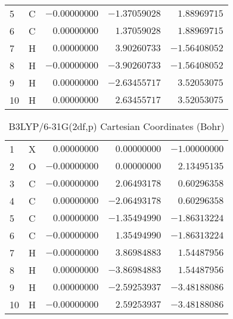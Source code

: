 \documentclass[10pt,oneside]{article}
\begin{document}
\begin{table}[h!]
\begin{multicols}{2}
\begin{tabular}{llrrr}
5  & C  & $-0.00000000$ & $-1.37059028$ & $ 1.88969715$ \\
6  & C  & $ 0.00000000$ & $ 1.37059028$ & $ 1.88969715$ \\
7  & H  & $ 0.00000000$ & $ 3.90260733$ & $-1.56408052$ \\
8  & H  & $-0.00000000$ & $-3.90260733$ & $-1.56408052$ \\
9  & H  & $ 0.00000000$ & $-2.63455717$ & $ 3.52053075$ \\
10 & H  & $ 0.00000000$ & $ 2.63455717$ & $ 3.52053075$ \\
\bottomrule
\end{tabular}
\end{multicols}
\end{table}

\begin{table}[h]
\centering
\caption{B3LYP/6-31G(2df,p) Cartesian Coordinates (Bohr)}
\begin{tabular}{llrrr}
\toprule
1  & X  & $ 0.00000000$ & $ 0.00000000$ & $-1.00000000$ \\
2  & O  & $-0.00000000$ & $ 0.00000000$ & $ 2.13495135$ \\
3  & C  & $-0.00000000$ & $ 2.06493178$ & $ 0.60296358$ \\
4  & C  & $ 0.00000000$ & $-2.06493178$ & $ 0.60296358$ \\
5  & C  & $ 0.00000000$ & $-1.35494990$ & $-1.86313224$ \\
6  & C  & $-0.00000000$ & $ 1.35494990$ & $-1.86313224$ \\
7  & H  & $-0.00000000$ & $ 3.86984883$ & $ 1.54487956$ \\
8  & H  & $ 0.00000000$ & $-3.86984883$ & $ 1.54487956$ \\
9  & H  & $ 0.00000000$ & $-2.59253937$ & $-3.48188086$ \\
10 & H  & $-0.00000000$ & $ 2.59253937$ & $-3.48188086$ \\
\bottomrule
\end{tabular}
\end{table}
\end{document}
